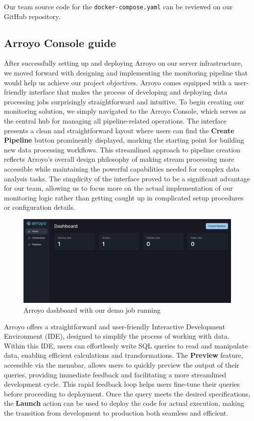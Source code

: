 Our team source code for the \texttt{docker-compose.yaml} can be reviewed on our GitHub repository.

\subsection{Arroyo Console guide}
After successfully setting up and deploying Arroyo on our server infrastructure, we moved forward
with designing and implementing the monitoring pipeline that would help us achieve our project
objectives. Arroyo comes equipped with a user-friendly interface that makes the process of
developing and deploying data processing jobs surprisingly straightforward and intuitive. To begin
creating our monitoring solution, we simply navigated to the Arroyo Console, which serves as the
central hub for managing all pipeline-related operations. The interface presents a clean and
straightforward layout where users can find the \textbf{Create Pipeline} button prominently
displayed, marking the starting point for building new data processing workflows. This streamlined
approach to pipeline creation reflects Arroyo's overall design philosophy of making stream
processing more accessible while maintaining the powerful capabilities needed for complex data
analysis tasks. The simplicity of the interface proved to be a significant advantage for our team,
allowing us to focus more on the actual implementation of our monitoring logic rather than getting
caught up in complicated setup procedures or configuration details.

\begin{figure}[H]
    \centering
    \includegraphics[width=\textwidth]{Images/arroyo_dashboard.png}
    \vspace{1em}
    \caption{Arroyo dashboard with our demo job running}
    \label{fig:arroyo_dashboard}
\end{figure}

Arroyo offers a straightforward and user-friendly Interactive Development Environment (IDE),
designed to simplify the process of working with data. Within this IDE, users can effortlessly write
SQL queries to read and manipulate data, enabling efficient calculations and transformations. The
\textbf{Preview} feature, accessible via the menubar, allows users to quickly preview the output of
their queries, providing immediate feedback and facilitating a more streamlined development cycle.
This rapid feedback loop helps users fine-tune their queries before proceeding to deployment. Once
the query meets the desired specifications, the \textbf{Launch} action can be used to deploy the
code for actual execution, making the transition from development to production both seamless and
efficient.

